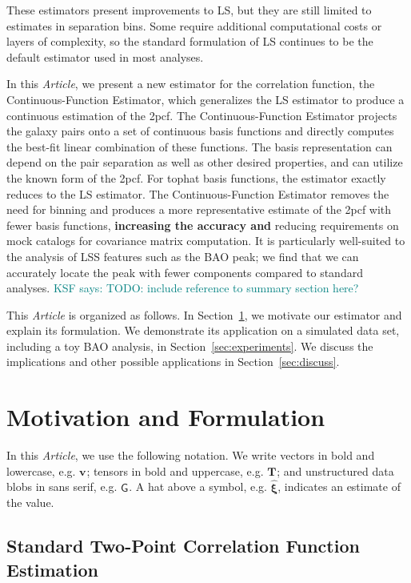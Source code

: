 \documentclass[modern]{aastex62}
\newcommand{\cf}{2pcf\xspace}
\newcommand{\Est}{The Continuous-Function Estimator\xspace}
\newcommand{\est}{the Continuous-Function Estimator\xspace}
\newcommand{\documentname}{\textsl{Article}\xspace}
\newcommand{\LS}{LS\xspace}
\newcommand{\bld}[1]{\bm{#1}}
\newcommand{\vv}[1]{\bld{v}_\mathrm{#1}}
\newcommand{\TT}[1]{\bld{T}_\mathrm{#1}}
\newcommand{\GG}[1]{\mathsf{G}_{#1}}
\newcommand{\KSF}[1]{\textcolor{teal}{KSF says: #1}}
\newcommand{\new}[1]{\textbf{#1}}
\begin{document}
These estimators present improvements to \LS, but they are still limited to estimates in separation bins.
Some require additional computational costs or layers of complexity, so the standard formulation of \LS continues to be the default estimator used in most analyses.

In this \documentname, we present a new estimator for the correlation function, \est, which generalizes the \LS estimator to produce a continuous estimation of the \cf. 
\Est projects the galaxy pairs onto a set of continuous basis functions and directly computes the best-fit linear combination of these functions.
The basis representation can depend on the pair separation as well as other desired properties, and can utilize the known form of the \cf.
For tophat basis functions, the estimator exactly reduces to the \LS estimator. 
\Est removes the need for binning and produces a more representative estimate of the \cf with fewer basis functions, \new{increasing the accuracy and} reducing requirements on mock catalogs for covariance matrix computation.
It is particularly well-suited to the analysis of LSS features such as the BAO peak; we find that we can accurately locate the peak with fewer components compared to standard analyses.
\KSF{TODO: include reference to summary section here?}

This \documentname is organized as follows. 
In Section~\ref{sec:motiv}, we motivate our estimator and explain its formulation.
We demonstrate its application on a simulated data set, including a toy BAO analysis, in Section~\ref{sec:experiments}.
We discuss the implications and other possible applications in Section~\ref{sec:discuss}. 


\section{Motivation and Formulation} 
\label{sec:motiv}

In this \documentname, we use the following notation.
We write vectors in bold and lowercase, e.g. $\vv{}$; tensors in bold and uppercase, e.g. $\TT{}$; and unstructured data blobs in sans serif, e.g. $\GG{}$.
A hat above a symbol, e.g. $\bld{\hat{\xi}}$, indicates an estimate of the value.

\subsection{Standard Two-Point Correlation Function Estimation}
\end{document}
